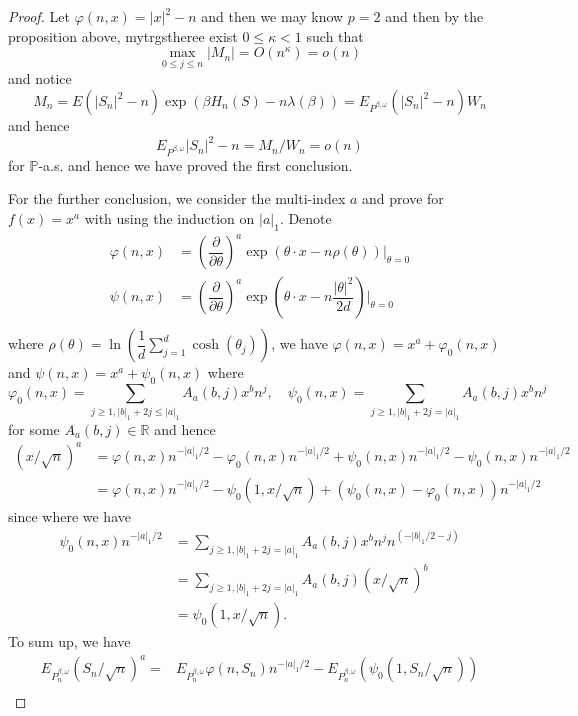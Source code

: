 \begin{proof}
    Let $\varphi(n,x) = |x|^2 - n$ and then we may know $p = 2$ and then by the proposition above, mytrgstheree exist $0\leq \kappa < 1$ such that
    \[
    \max_{0\leq j \leq n} |M_n| = O(n^{\kappa}) = o(n)
    \]
    and notice
    \[
    M_n = E(|S_n|^2 - n)\exp(\beta H_n(S) - n\lambda(\beta)) = E_{P^{\beta,\omega}}(|S_n|^2 - n)W_n
    \]
    and hence
    \[
    E_{P^{\beta,\omega}}|S_n|^2 - n = M_n/W_n = o(n)
    \]
    for $\mathbb{P}$-a.s. and hence we have proved the first conclusion.\par
    For the further conclusion, we consider the multi-index $a$ and prove for $f(x) = x^a$ with using the induction on $|a|_1$. Denote
    \[
    \begin{aligned}
        \varphi(n,x) &= \left(\dfrac{\partial}{\partial \theta}\right)^a\exp\left(\theta\cdot x - n\rho(\theta)\right)|_{\theta = 0} \\
        \psi(n,x) &= \left(\dfrac{\partial}{\partial \theta}\right)^a\exp\left(\theta\cdot x - n\dfrac{|\theta|^2}{2d}\right)|_{\theta = 0} \\
    \end{aligned}
    \]
    where $\rho(\theta) = \ln\left(\dfrac{1}{d}\sum\limits_{j = 1}^d\cosh(\theta_j)\right)$, we have $\varphi(n,x) = x^a + \varphi_0(n,x)$ and $\psi(n,x) = x^a + \psi_0(n,x)$ where
    \[
    \varphi_0(n,x) = \sum\limits_{j\geq 1, |b|_1+2j \leq |a|_1} A_a(b,j)x^bn^j,\quad \psi_0(n,x) = \sum\limits_{j\geq 1, |b|_1+2j = |a|_1} A_a(b,j)x^bn^j
    \]
    for some $A_a(b,j) \in \mathbb{R}$ and hence
    \[
    \begin{aligned}
        (x/\sqrt{n})^a &= \varphi(n,x)n^{-|a|_1/2} - \varphi_0(n,x) n^{-|a|_1/2} + \psi_0(n,x)n^{-|a|_1/2} - \psi_0(n,x)n^{-|a|_1/2} \\
        &= \varphi(n,x)n^{-|a|_1/2} - \psi_0(1,x/\sqrt{n}) + (\psi_0(n,x) - \varphi_0(n,x))n^{-|a|_1/2}
    \end{aligned}
    \]
    since where we have
    \[
    \begin{aligned}
        \psi_0(n,x)n^{-|a|_1/2} &= \sum\limits_{j\geq 1, |b|_1+2j = |a|_1} A_a(b,j)x^bn^jn^{(-|b|_1/2 - j)} \\ &= \sum\limits_{j\geq 1, |b|_1+2j = |a|_1} A_a(b,j)(x/\sqrt{n})^{b} \\
        &= \psi_0(1,x/\sqrt{n}).
    \end{aligned}
    \]
    To sum up, we have
    \[
    \begin{aligned}
        E_{P^{\beta,\omega}_n}(S_n/\sqrt{n})^a =& E_{P^{\beta,\omega}_n} \varphi(n,S_n)n^{-|a|_1/2} - E_{P^{\beta,\omega}_n}(\psi_0(1,S_n/\sqrt{n})) \\

\end{aligned}\]
\end{proof}
